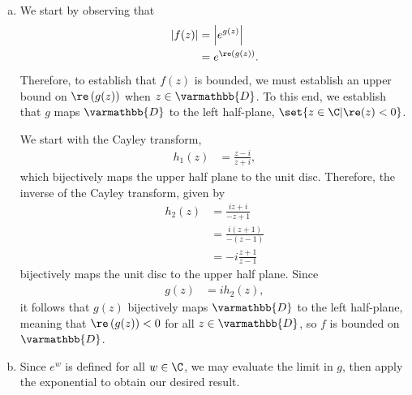\documentclass[10pt]{mypackage}
\renewcommand*{\mathbb}[1]{\varmathbb{#1}}
\begin{document}
\begin{solution}\hfill
  \begin{enumerate}[(a)]
    \item We start by observing that
      \begin{align*}
        \left\vert f(z) \right\vert &= \left\vert e^{g(z)} \right\vert\\
                                    &= e^{\re\left( g(z) \right)}.
      \end{align*}
      Therefore, to establish that $f(z)$ is bounded, we must establish an upper bound on $\re\left( g(z) \right)$ when $z\in \mathbb{D}$. To this end, we establish that $g$ maps $ \mathbb{D} $ to the left half-plane, $\set{z\in \C | \re(z) < 0}$.\newline

      We start with the Cayley transform, 
      \begin{align*}
        h_1(z) &= \frac{z-i}{z+i},
      \end{align*}
      which bijectively maps the upper half plane to the unit disc. Therefore, the inverse of the Cayley transform, given by
      \begin{align*}
        h_2(z) &= \frac{iz + i}{-z + 1}\\
               &= \frac{i\left( z+1 \right)}{-\left( z - 1 \right)}\\
               &= -i \frac{z+1}{z-1}
      \end{align*}
      bijectively maps the unit disc to the upper half plane. Since
      \begin{align*}
        g(z) &= i h_2(z),
      \end{align*}
      it follows that $g(z)$ bijectively maps $ \mathbb{D} $ to the left half-plane, meaning that $\re\left( g(z) \right) < 0$ for all $z\in \mathbb{D}$, so $f$ is bounded on $ \mathbb{D} $.
    \item Since $e^{w}$ is defined for all $w\in \C$, we may evaluate the limit in $g$, then apply the exponential to obtain our desired result. 
  \end{enumerate}
\end{solution}
\end{document}
